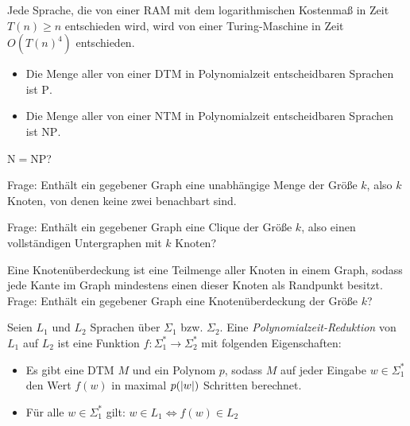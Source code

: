 \documentclass{cheat-sheet}
\begin{document}
\begin{satz}
  Jede Sprache, die von einer RAM mit dem logarithmischen Kostenmaß in Zeit $T(n) \geq n$ entschieden wird, wird von einer Turing-Maschine in Zeit $O(T(n)^4)$ entschieden.
\end{satz}


\begin{nota}
  \begin{itemize}
    \item Die Menge aller von einer DTM in Polynomialzeit entscheidbaren Sprachen ist $\mathrm{P}$.
    \item Die Menge aller von einer NTM in Polynomialzeit entscheidbaren Sprachen ist $\mathrm{NP}$.
  \end{itemize}
\end{nota}

\begin{frage}
  $\mathrm{N} = \mathrm{NP}$?
\end{frage}

\begin{prob}
  Frage: Enthält ein gegebener Graph eine unabhängige Menge der Größe $k$, also $k$ Knoten, von denen keine zwei benachbart sind.
\end{prob}


\begin{prob}[Clique]
  Frage: Enthält ein gegebener Graph eine Clique der Größe $k$, also einen vollständigen Untergraphen mit $k$ Knoten?
\end{prob}

\begin{prob}
  Eine Knotenüberdeckung ist eine Teilmenge aller Knoten in einem Graph, sodass jede Kante im Graph mindestens einen dieser Knoten als Randpunkt besitzt. Frage: Enthält ein gegebener Graph eine Knotenüberdeckung der Größe $k$?
\end{prob}

\begin{defn}
  Seien $L_1$ und $L_2$ Sprachen über $\Sigma_1$ bzw. $\Sigma_2$. Eine \emph{Polynomialzeit-Reduktion} von $L_1$ auf $L_2$ ist eine Funktion $f : \Sigma_1^* \to \Sigma_2^*$ mit folgenden Eigenschaften:
  \begin{itemize}
    \item Es gibt eine DTM $M$ und ein Polynom $p$, sodass $M$ auf jeder Eingabe $w \in \Sigma_1^*$ den Wert $f(w)$ in maximal $p(\lvert w\rvert)$ Schritten berechnet.
    \item Für alle $w \in \Sigma_1^*$ gilt: $w \in L_1 \iff f(w) \in L_2$
  \end{itemize}
\end{defn}
\end{document}
